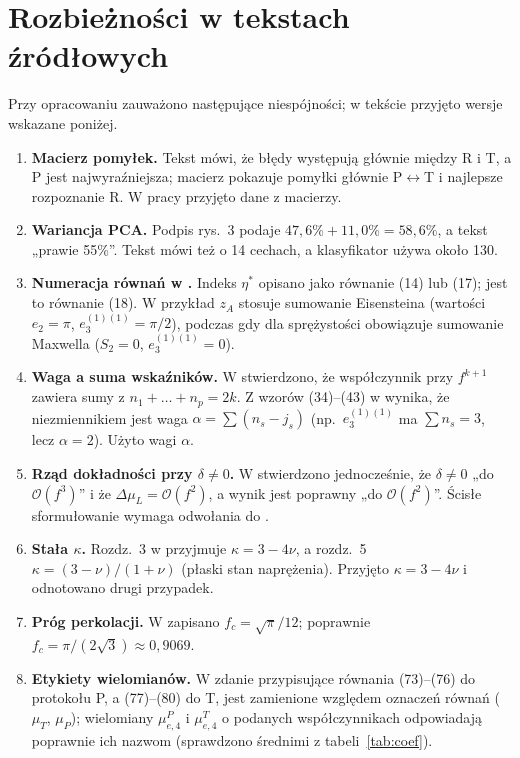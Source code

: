 \documentclass[12pt,a4paper,twoside,openright]{report}
\theoremstyle{definition}
\theoremstyle{remark}
\begin{document}
\chapter{Rozbieżności w tekstach źródłowych}\label{app:notes}
Przy opracowaniu zauważono następujące niespójności; w tekście przyjęto wersje wskazane poniżej.
\begin{enumerate}[nosep]
\item \textbf{Macierz pomyłek.} Tekst \cite{mityushev2025computationalpart3} mówi, że błędy występują głównie między R i T, a P jest najwyraźniejsza; macierz pokazuje pomyłki głównie P$\leftrightarrow$T i najlepsze rozpoznanie R. W pracy przyjęto dane z macierzy.
\item \textbf{Wariancja PCA.} Podpis rys.~3 \cite{mityushev2025computationalpart3} podaje $47{,}6\%+11{,}0\%=58{,}6\%$, a tekst „prawie 55\%”. Tekst mówi też o 14 cechach, a klasyfikator używa około 130.
\item \textbf{Numeracja równań w \cite{mityushev2025computationalpart3}.} Indeks $\eta^*$ opisano jako równanie (14) lub (17); jest to równanie (18). W \cite{mityushev2025computationalpart3} przykład $z_A$ stosuje sumowanie Eisensteina (wartości $e_2=\pi$, $e_3^{(1)(1)}=\pi/2$), podczas gdy dla sprężystości obowiązuje sumowanie Maxwella ($S_2=0$, $e_3^{(1)(1)}=0$).
\item \textbf{Waga a suma wskaźników.} W \cite{mityushev2025computationalpart3} stwierdzono, że współczynnik przy $f^{k+1}$ zawiera sumy z $n_1+\dots+n_p=2k$. Z wzorów (34)--(43) w \cite{czapla2025computational} wynika, że niezmiennikiem jest waga $\alpha=\sum(n_s-j_s)$ (np.\ $e_3^{(1)(1)}$ ma $\sum n_s=3$, lecz $\alpha=2$). Użyto wagi $\alpha$.
\item \textbf{Rząd dokładności przy $\delta\ne0$.} W \cite{czapla2025computational} stwierdzono jednocześnie, że $\delta\neq0$ „do $\mathcal O(f^3)$” i że $\Delta\mu_L=\mathcal O(f^2)$, a wynik jest poprawny „do $\mathcal O(f^2)$”. Ścisłe sformułowanie wymaga odwołania do \cite{rayleigh1892lvi,mcphedran1978conductivity,mckenzie1978conductivity,mityushev1997transport}.
\item \textbf{Stała $\kappa$.} Rozdz.~3 w \cite{czapla2025computational} przyjmuje $\kappa=3-4\nu$, a rozdz.~5 $\kappa=(3-\nu)/(1+\nu)$ (płaski stan naprężenia). Przyjęto $\kappa=3-4\nu$ i odnotowano drugi przypadek.
\item \textbf{Próg perkolacji.} W \cite{czapla2025computational} zapisano $f_c=\sqrt\pi/12$; poprawnie $f_c=\pi/(2\sqrt3)\approx0{,}9069$.
\item \textbf{Etykiety wielomianów.} W \cite{czapla2025computational} zdanie przypisujące równania (73)--(76) do protokołu P, a (77)--(80) do T, jest zamienione względem oznaczeń równań ($\mu_T$, $\mu_P$); wielomiany $\mu^P_{e,4}$ i $\mu^T_{e,4}$ o podanych współczynnikach odpowiadają poprawnie ich nazwom (sprawdzono średnimi z tabeli~\ref{tab:coef}).

\end{enumerate}
\end{document}
